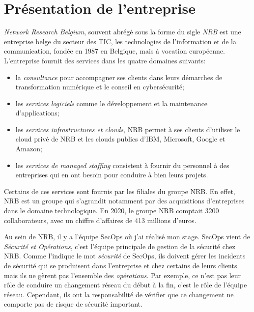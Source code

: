 
\chapter*{Présentation de l'entreprise} 

\textit{Network Research Belgium}, souvent abrégé sous la forme du sigle \textit{NRB} est une entreprise belge du secteur des TIC, les technologies de l'information et de la communication, fondée en 1987 en Belgique, mais à vocation européenne. L'entreprise fournit des services dans les quatre domaines suivants:
\begin{itemize}
    \item la \textit{consultance} pour accompagner ses clients dans leurs démarches de transformation numérique et le conseil en cybersécurité;
    \item les \textit{services logiciels} comme le développement et la maintenance d'applications;
    \item les \textit{services infrastructures et clouds}, NRB permet à ses clients d'utiliser le cloud privé de NRB et les clouds publics d'IBM, Microsoft, Google et Amazon;
    \item les \textit{services de managed staffing} consistent à fournir du personnel à des entreprises qui en ont besoin pour conduire à bien leurs projets.
\end{itemize}

Certains de ces services sont fournis par les filiales du groupe NRB. En effet, NRB est un groupe qui s'agrandit notamment par des acquisitions d'entreprises dans le domaine technologique. En 2020, le groupe NRB comptait 3200 collaborateurs, avec un chiffre d'affaires de 413 millions d'euros.

Au sein de NRB, il y a l'équipe SecOps où j'ai réalisé mon stage. SecOps vient de \textit{Sécurité et Opérations}, c'est l'équipe principale de gestion de la sécurité chez NRB. Comme l'indique le mot \textit{sécurité} de SecOps, ils doivent gérer les incidents de sécurité qui se produisent dans l'entreprise et chez certains de leurs clients mais ils ne gèrent pas l'ensemble des \textit{opérations}. Par exemple, ce n'est pas leur rôle de conduire un changement réseau du début à la fin, c'est le rôle de l'équipe réseau. Cependant, ils ont la responsabilité de vérifier que ce changement ne comporte pas de risque de sécurité important.

